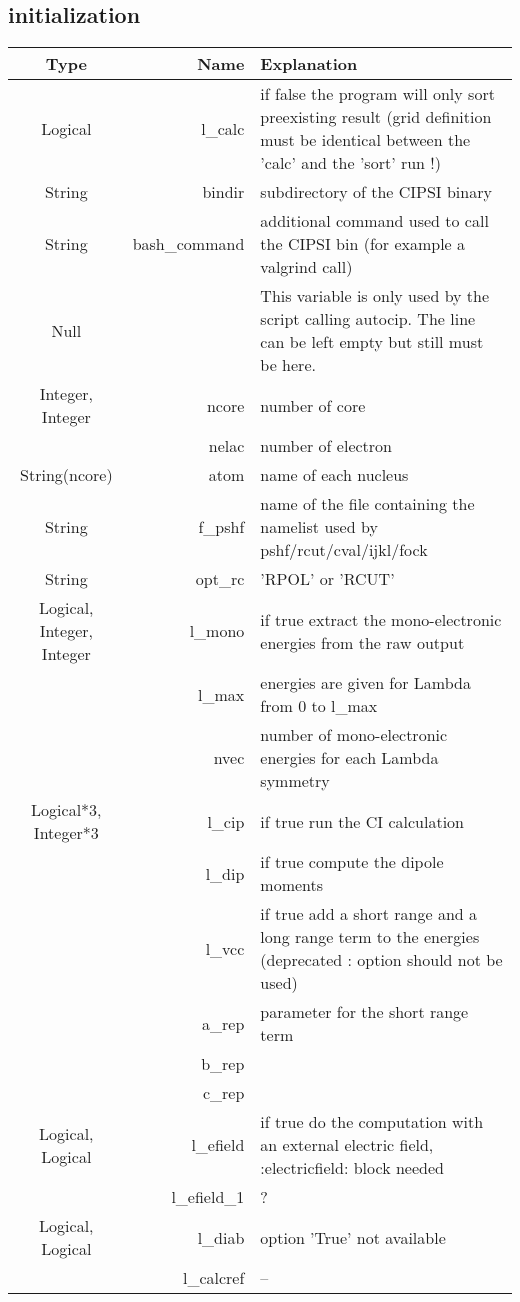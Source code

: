 \documentclass[a4paper,10pt]{article}
\begin{document}
\subsection{initialization}
\label{init}

\begin{tabular}{|crp{110mm}|}         \hline
\bf{Type} & \bf{Name} & \hspace{4cm}\bf{Explanation}\\ \hline
Logical & l\_calc & if false the program will only sort preexisting result (grid definition must be identical between the 'calc' and the 'sort' run !)\\\hline
String & bindir & subdirectory of the CIPSI binary\\\hline
String & bash\_command & additional command used to call the CIPSI bin (for example a valgrind call)\\\hline
Null & & This variable is only used by the script calling autocip. The line can be left empty but still must be here.  \\\hline
Integer, Integer & ncore & number of core \\
                 & nelac & number of electron \\\hline
String(ncore) & atom & name of each nucleus \\\hline
String & f\_pshf & name of the file containing the namelist used by pshf/rcut/cval/ijkl/fock \\\hline
String & opt\_rc & 'RPOL' or 'RCUT' \\\hline
Logical, Integer, Integer & l\_mono & if true extract the mono-electronic energies from the raw output\\
                          & l\_max & energies are given for Lambda from 0 to l\_max \\
                          &  nvec & number of mono-electronic energies for each Lambda symmetry\\\hline
Logical*3, Integer*3 & l\_cip & if true run the CI calculation\\
& l\_dip & if true compute the dipole moments \\
& l\_vcc & if true add a short range and a long range term to the energies (deprecated : option should not be used)\\
& a\_rep & parameter for the short range term\\
& b\_rep & \\
& c\_rep & \\ \hline
Logical, Logical & l\_efield & if true do the computation with an external electric field, :electricfield: block needed \\
&l\_efield\_1& ? \\\hline
Logical, Logical & l\_diab& option 'True' not available\\
&  l\_calcref & -- \\\hline
\end{tabular}
\end{document}

